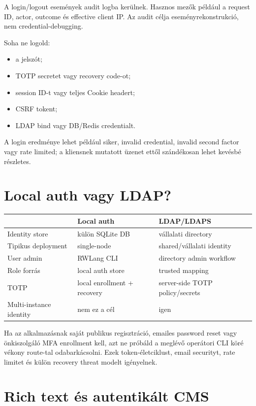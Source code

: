 A login/logout események audit logba kerülnek. Hasznos mezők például a request ID, actor, outcome és effective client IP. Az audit célja eseményrekonstrukció, nem credential-debugging.

Soha ne logold:

\begin{itemize}
  \item a jelszót;
  \item TOTP secretet vagy recovery code-ot;
  \item session ID-t vagy teljes Cookie headert;
  \item CSRF tokent;
  \item LDAP bind vagy DB/Redis credentialt.
\end{itemize}

A login eredménye lehet például siker, invalid credential, invalid second factor vagy rate limited; a kliensnek mutatott üzenet ettől szándékosan lehet kevésbé részletes.

\section{Local auth vagy LDAP?}

\begin{center}
\begin{tabularx}{\textwidth}{@{}lYY@{}}
\toprule
 & Local auth & LDAP/LDAPS \\
\midrule
Identity store & külön SQLite DB & vállalati directory \\
Tipikus deployment & single-node & shared/vállalati identity \\
User admin & RWLang CLI & directory admin workflow \\
Role forrás & local auth store & trusted mapping \\
TOTP & local enrollment + recovery & server-side TOTP policy/secrets \\
Multi-instance identity & nem ez a cél & igen \\
\bottomrule
\end{tabularx}
\end{center}

Ha az alkalmazásnak saját publikus regisztráció, emailes password reset vagy önkiszolgáló MFA enrollment kell, azt ne próbáld a meglévő operátori CLI köré vékony route-tal odabarkácsolni. Ezek token-életciklust, email securityt, rate limitet és külön recovery threat modelt igényelnek.

\section{Rich text és autentikált CMS}

